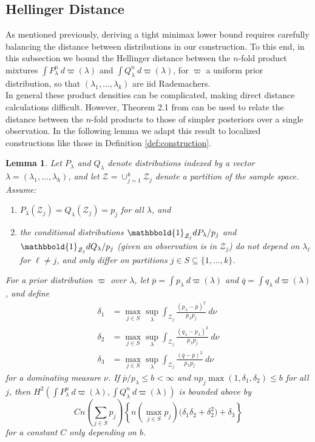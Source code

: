 \documentclass[11pt,twoside]{article}
\newcommand{\one}{\mathbbold{1}}
\newtheorem{lemma}{Lemma}
\theoremstyle{definition}
\theoremstyle{remark}
\begin{document}
\subsection{Hellinger Distance}

As mentioned previously, deriving a tight minimax lower bound requires carefully balancing the distance between distributions in our construction. To this end, in this subsection we bound the Hellinger distance between the $n$-fold product mixtures $\int P_\lambda^n \ d\varpi(\lambda)$ and $\int Q_\lambda^n \ d\varpi(\lambda)$, for $\varpi$ a uniform prior distribution, so that $(\lambda_1,\dots,\lambda_k)$ are iid Rademachers. \\

In general these product densities can be complicated, making direct distance calculations difficult. However, Theorem 2.1 from \citet{robins2009semiparametric} can be used to relate the distance between the $n$-fold products to those of simpler posteriors over a single observation. In the following lemma we adapt this result to localized constructions like those in Definition \ref{def:construction}. \\


\begin{lemma} \label{lem:hellbound}
Let $P_\lambda$ and $Q_\lambda$ denote distributions indexed by a vector $\lambda=(\lambda_1,\dots,\lambda_k)$, and let $\mathcal{Z}=\cup_{j=1}^k \mathcal{Z}_j$ denote a partition of the sample space. 
Assume:
\begin{enumerate}
\item $P_\lambda(\mathcal{Z}_j)=Q_\lambda(\mathcal{Z}_j)=p_j$ for all $\lambda$, and
\item the conditional distributions $\one_{\mathcal{Z}_j} dP_\lambda / p_j$ and $\one_{\mathcal{Z}_j} dQ_\lambda / p_j$ (given an observation is in $\mathcal{Z}_j$) do not depend on $\lambda_\ell$ for $\ell \neq j$, and only differ on partitions $j \in S \subseteq \{1,\dots,k\}$.
\end{enumerate}
For a prior distribution $\varpi$ over $\lambda$, let $\overline{p}=\int p_\lambda \ d\varpi(\lambda)$ and $\overline{q}=\int q_\lambda \ d\varpi(\lambda)$, and define 
\begin{align*}
\delta_1 &= \max_{j \in S} \sup_\lambda \int_{\mathcal{Z}_j} \frac{(p_\lambda - \overline{p})^2}{p_\lambda p_j} \ d\nu \nonumber \\
\delta_2 &= \max_{j \in S} \sup_\lambda \int_{\mathcal{Z}_j} \frac{(q_\lambda - p_\lambda)^2}{p_\lambda p_j} \ d\nu \label{eq:bdcomps} \\
\delta_3 &= \max_{j \in S} \sup_\lambda \int_{\mathcal{Z}_j} \frac{(\overline{q} - \overline{p})^2}{p_\lambda p_j} \ d\nu \nonumber
\end{align*}
for  a dominating measure $\nu$. 
If $\overline{p}/p_\lambda \leq b < \infty$ and $n p_j \max(1,\delta_1,\delta_2) \leq b$ for all $j$, 
then $H^2\left(\int P_\lambda^n \ d\varpi(\lambda), \int Q_\lambda^n \ d\varpi(\lambda) \right) $ is bounded above by
$$  Cn \left( \sum_{j \in S} p_j \right) \left\{ n \left( \max_{j \in S} p_j \right) \Big(\delta_1 \delta_2 + \delta_2^2 \Big) + \delta_3 \right\} $$ 
for a constant $C$ only depending on $b$.
\end{lemma}
\end{document}
